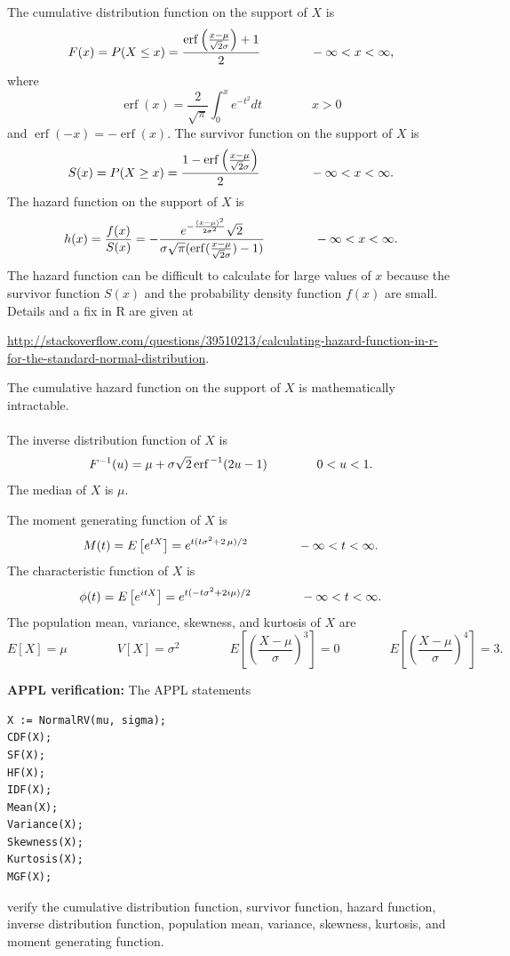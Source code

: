 \documentclass[12pt,fullpage]{article}
\DeclareMathOperator{\erf}{erf}
\begin{document}
\noindent
The cumulative distribution function on
the support of $X$ is
$$
F(x) = P(X \le x) = \frac{{\it \erf} \left({\frac { x-{\it 
\mu}}{{\sqrt{2} \it \sigma }}} \right)+1}{2}  \qquad \qquad -\infty < x < \infty,
$$
where
$$
\erf(x) = \frac{2}{\sqrt{\pi}}\int_0 ^x e^{-{t^2}}dt \qquad \qquad x > 0
$$
and $\erf(-x) = -\erf(x)$.
The survivor function on the support of $X$ is
$$
S(x) = P(X \ge x) = \frac{1 - {\it \erf} \left({\frac { x-{\it 
\mu}}{{\sqrt{2} \it \sigma }}} \right)}{2}  \qquad \qquad -\infty < x < \infty.
$$
The hazard function on the support of $X$ is
$$
h(x) = \frac{f(x)}{S(x)} = -\frac{{e^{- \frac {( x-{\it \mu}) ^{2}}{2{{\it 
\sigma}}^{2}}}}\sqrt {2}}{{{\it \sigma}}\sqrt {\pi }
({\it \erf} ({\frac { x-{\it \mu}}{{\sqrt{2} \it \sigma }}} ) - 1)} \qquad \qquad -\infty < x < \infty.
$$
The hazard function can be difficult to calculate for large values of $x$
because the survivor function $S(x)$ and the probability density function $f(x)$ are small.
Details and a fix in R are given at
\begin{scriptsize}
\color{blue}\url{http://stackoverflow.com/questions/39510213/calculating-hazard-function-in-r-for-the-standard-normal-distribution}\color{black}.
\end{scriptsize}
The cumulative hazard function on the support of $X$ is mathematically intractable.
\\
\\
The inverse distribution function of $X$ is
$$
F ^ {-1}(u) = {\it \mu} + {\it \sigma}\sqrt{2}\, {\erf}^{\kern 0.08 em -1} (2u - 1) \qquad \qquad 0 < u < 1.
$$
The median of $X$ is $\mu$.

\noindent
The moment generating function of $X$ is
$$
M(t) = E\left[ e ^ {tX} \right] = e^{t( t{{\it \sigma}}^{2}+2\,{\it \mu})/2} \qquad \qquad -\infty < t < \infty.
$$
The characteristic function of $X$ is
$$
\phi(t) = E\left[ e ^ {itX} \right] =  e^{t( -t{{\it \sigma}}^{2}+2i{\it \mu})/2} \qquad \qquad -\infty < t < \infty.
$$
The population mean, variance, skewness, and kurtosis of $X$ are
$$
E[X] = \mu \qquad \qquad 
V[X] = \sigma^2 \qquad \qquad 
E\left[ \left( \frac{X - \mu}{\sigma} \right) ^ 3 \right] = 0 \qquad \qquad 
E\left[ \left( \frac{X - \mu}{\sigma} \right) ^ 4 \right] = 3.
$$


\vspace{0.1in}

\noindent
{\bf APPL verification:}
The APPL statements
\begin{verbatim}
X := NormalRV(mu, sigma);
CDF(X);
SF(X);
HF(X);
IDF(X);
Mean(X);
Variance(X);
Skewness(X);
Kurtosis(X);
MGF(X);
\end{verbatim}
verify the cumulative distribution function, survivor function, hazard function, inverse distribution function, population mean, variance, skewness, kurtosis, and moment generating function.
\end{document}
